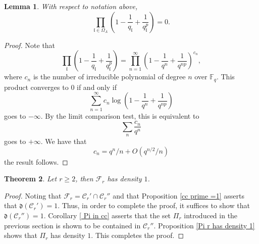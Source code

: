 \documentclass[11pt]{amsart}
\newtheorem{theorem}{Theorem}[section]
\newtheorem{lemma}[theorem]{Lemma}
\newcommand{\cF}{\mathcal{F}}
\newcommand{\fl}{\mathfrak{l}}
\newcommand{\F}{\mathbb{F}}
\newcommand{\cC}{\mathcal{C}}
\newcommand{\op}[1]{\operatorname{#1}}
\numberwithin{equation}{section}
\begin{document}
\begin{lemma}\label{last lemma}
    With respect to notation above, 
    \[\prod_{\fl\in \Omega_A}\left(1-\frac{1}{q_{\fl}}+\frac{1}{q_{\fl}^p}\right)=0. \]
\end{lemma}
\begin{proof}
    Note that \[\prod_{\fl}\left(1-\frac{1}{q_{\fl}}+\frac{1}{q_{\fl}^p}\right)=\prod_{n=1}^\infty \left(1-\frac{1}{q^n}+\frac{1}{q^{np}}\right)^{c_n},\] where $c_n$ is the number of irreducible polynomial of degree $n$ over $\F_q$. This product converges to $0$ if and only if 
    \[\sum_{n=1}^\infty c_n\op{log} \left(1-\frac{1}{q^n}+\frac{1}{q^{np}}\right)\] goes to $-\infty$. By the limit comparison test, this is equivalent to 
    \[\sum_n \frac{c_n}{q^n} \] goes to $+\infty$. We have that 
    \[c_n=q^n/n +O(q^{n/2}/n)\]
    \cite[Theorem 2.2]{Rosen} the result follows.
\end{proof}


\begin{theorem}\label{main thm end}
    Let $r\geq 2$, then $\cF_r$ has density $1$.
\end{theorem}

\begin{proof}
    Noting that $\cF_r=\cC_r'\cap \cC_r''$ and that Proposition \ref{cc prime =1} asserts that $\mathfrak{d}(\cC_r')=1$. Thus, in order to complete the proof, it suffices to show that $\mathfrak{d}(\cC_r'')=1$. Corollary \ref{ Pi in cc} asserts that the set $\Pi_r$ introduced in the previous section is shown to be contained in $\cC_r''$. Proposition \ref{Pi r has density 1} shows that $\Pi_r$ has density $1$. This completes the proof.
\end{proof}



\end{document}
